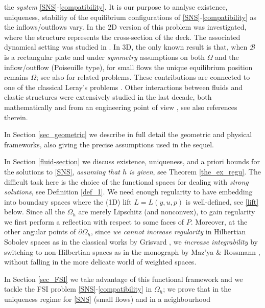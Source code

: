 \documentclass[11pt,a4paper]{amsart}
\theoremstyle{remark}
\theoremstyle{definition}
\numberwithin{equation}{section}
\numberwithin{proposition}{section}
\begin{document}
	the {\em system} \eqref{SNS}-\eqref{compatibility}.
	It is our purpose to analyse existence, uniqueness, stability of the equilibrium configurations of
	\eqref{SNS}-\eqref{compatibility} as the inflows/outflows vary. In \cite{simona, edofil,edofil2,GS} the 2D version of this problem was investigated, where the structure represents the cross-section of the deck. The associated dynamical setting was studied in \cite{BHPS, pata, Patriarca2022}.
	In 3D, the only known result \cite{clara} is that, when $\mathcal{B}$ is a rectangular plate and under {\em symmetry} assumptions on both
	$\Omega$ and the inflow/outflow (Poiseuille type), for small flows the unique equilibrium position remains $\Omega$; see also \cite{denisgaldi, FGS2020} for related problems. These contributions
are connected to one of the classical Leray's problems \cite{AM2,AM3}.
 Other interactions between fluids and elastic structures were extensively studied in the last decade, both mathematically \cite{KukaMu,Bociu20,GraHil16,MuS22} and from an engineering point of view \cite{Kanaris-Grigoriadis-Kassinos2011}, see also references therein. \par	
	In Section \ref{sec_geometric} we describe in full detail the geometric and physical frameworks, also giving
	the precise assumptions used in the sequel.\par
In Section \ref{fluid-section} we discuss existence, uniqueness, and a priori bounds for
	the solutions to \eqref{SNS}, {\em assuming that $h$ is given}, see Theorem \ref{the_ex_regu}. The difficult task here is the choice of the functional spaces for dealing with {\em strong solutions}, see Definition
\ref{def_1}. We need enough regularity to have embedding into boundary spaces where the (1D) lift $L=L(y,u,p)$ is well-defined, see \eqref{lift} below. Since all the $\Omega_h$ are merely Lipschitz (and nonconvex),
to gain regularity we first perform a reflection with respect to some faces of $P$. Moreover, at the other angular points of $\partial\Omega_h$, since {\em we cannot increase regularity} in Hilbertian Sobolev spaces as in the classical works by Grisvard \cite{GrisvardBUMI,grisvardpisa,grisvardlibro}, we {\em increase
integrability} by switching to non-Hilbertian spaces as in the monograph by Maz'ya \& Rossmann \cite{Mazya-Rossmann2010}, without falling in the more delicate world of weighted spaces. \par
In Section \ref{sec_FSI} we take advantage of this functional framework and we tackle the
FSI problem \eqref{SNS}-\eqref{compatibility} in $\Omega_h$; we prove that in the uniqueness regime for \eqref{SNS} (small flows) and in a neighbourhood
\end{document}

